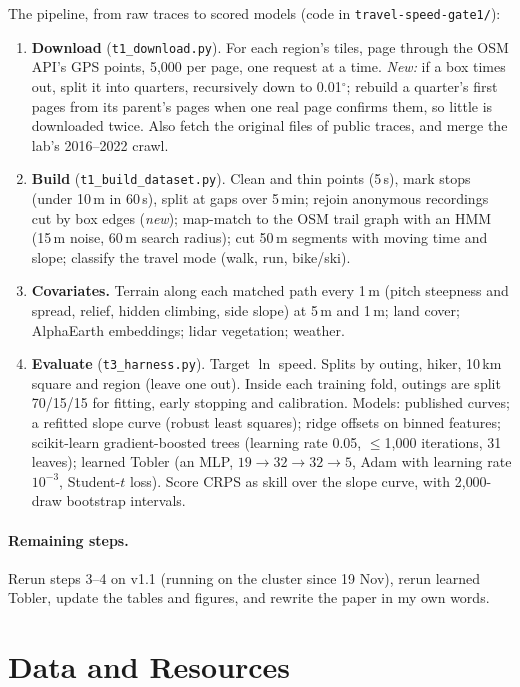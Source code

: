 \documentclass[10pt,twocolumn,letterpaper]{article}
\begin{document}
The pipeline, from raw traces to scored models (code in \texttt{travel-speed-gate1/}):
\begin{enumerate}\setlength\itemsep{1pt}
\item \textbf{Download} (\texttt{t1\_download.py}). For each region's tiles, page through the OSM API's GPS points, 5{,}000 per page, one request at a time. \emph{New:} if a box times out, split it into quarters, recursively down to 0.01$^\circ$; rebuild a quarter's first pages from its parent's pages when one real page confirms them, so little is downloaded twice. Also fetch the original files of public traces, and merge the lab's 2016--2022 crawl.
\item \textbf{Build} (\texttt{t1\_build\_dataset.py}). Clean and thin points (5\,s), mark stops (under 10\,m in 60\,s), split at gaps over 5\,min; rejoin anonymous recordings cut by box edges (\emph{new}); map-match to the OSM trail graph with an HMM~\cite{newson2009hidden} (15\,m noise, 60\,m search radius); cut 50\,m segments with moving time and slope; classify the travel mode (walk, run, bike/ski).
\item \textbf{Covariates.} Terrain along each matched path every 1\,m (pitch steepness and spread, relief, hidden climbing, side slope) at 5\,m and 1\,m; land cover; AlphaEarth embeddings; lidar vegetation; weather.
\item \textbf{Evaluate} (\texttt{t3\_harness.py}). Target $\ln$ speed. Splits by outing, hiker, 10\,km square and region (leave one out). Inside each training fold, outings are split 70/15/15 for fitting, early stopping and calibration. Models: published curves; a refitted slope curve (robust least squares); ridge offsets on binned features; scikit-learn gradient-boosted trees (learning rate 0.05, $\le$1{,}000 iterations, 31 leaves); learned Tobler (an MLP, $19\to32\to32\to5$, Adam with learning rate $10^{-3}$, Student-$t$ loss). Score CRPS as skill over the slope curve, with 2{,}000-draw bootstrap intervals.
\end{enumerate}
\paragraph{Remaining steps.} Rerun steps 3--4 on v1.1 (running on the cluster since 19 Nov), rerun learned Tobler, update the tables and figures, and rewrite the paper in my own words.

\section{Data and Resources}
\label{sec:data}
\end{document}
